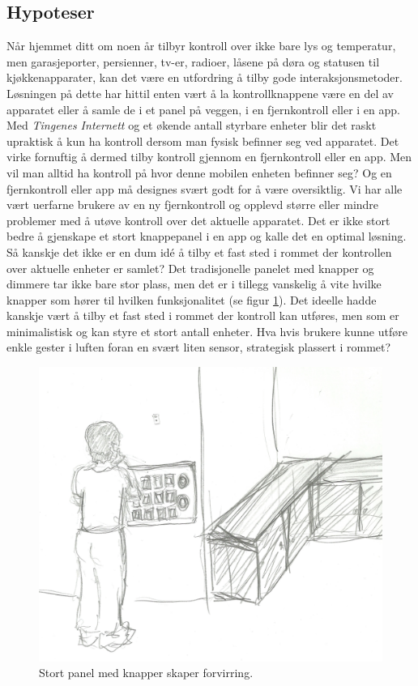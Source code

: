 \subsection{Hypoteser}
Når hjemmet ditt om noen år tilbyr kontroll over ikke bare lys og temperatur, men garasjeporter, persienner, tv-er, radioer, låsene på døra og statusen til kjøkkenapparater, kan det være en utfordring å tilby gode interaksjonsmetoder. Løsningen på dette har hittil enten vært å la kontrollknappene være en del av apparatet eller å samle de i et panel på veggen, i en fjernkontroll eller i en app. Med \emph{Tingenes Internett} og et økende antall styrbare enheter blir det raskt upraktisk å kun ha kontroll dersom man fysisk befinner seg ved apparatet. Det virke fornuftig å dermed tilby kontroll gjennom en fjernkontroll eller en app. Men vil man alltid ha kontroll på hvor denne mobilen enheten befinner seg? Og en fjernkontroll eller app må designes svært godt for å være oversiktlig. Vi har alle vært uerfarne brukere av en ny fjernkontroll og opplevd større eller mindre problemer med å utøve kontroll over det aktuelle apparatet.  Det er ikke stort bedre å gjenskape et stort knappepanel i en app og kalle det en optimal løsning. Så kanskje det ikke er en dum idé å tilby et fast sted i rommet der kontrollen over aktuelle enheter er samlet? Det tradisjonelle panelet med knapper og dimmere tar ikke bare stor plass, men det er i tillegg vanskelig å vite hvilke knapper som hører til hvilken funksjonalitet (se figur \ref{fig:panel}). Det ideelle hadde kanskje vært å tilby et fast sted i rommet der kontroll kan utføres, men som er minimalistisk og kan styre et stort antall enheter. Hva hvis brukere kunne utføre enkle gester i luften foran en svært liten sensor, strategisk plassert i rommet?
\begin{figure}
\centering
\includegraphics[scale=0.1]{fig/buttons}
\caption{Stort panel med knapper skaper forvirring.}
\label{fig:panel}
\end{figure}\newline
